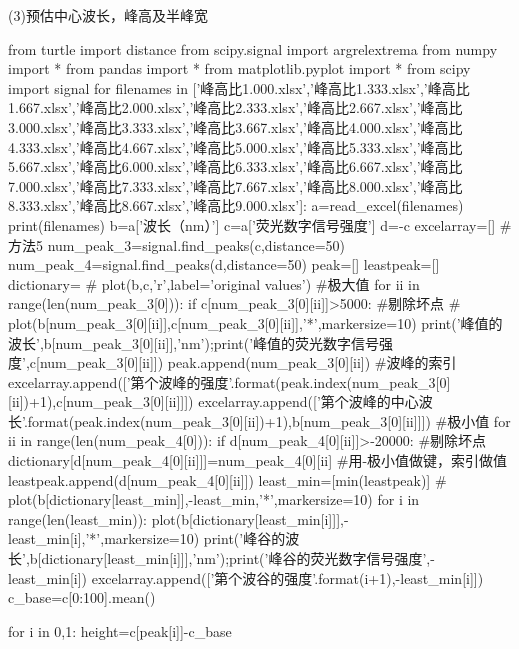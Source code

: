 \documentclass{article}
\numberwithin{equation}{subsection}
\begin{document}
(3)预估中心波长，峰高及半峰宽
\begin{python}
from turtle import distance
from scipy.signal import argrelextrema
from numpy import *
from pandas import *
from matplotlib.pyplot import *
from scipy import signal
for filenames in ['峰高比1.000.xlsx','峰高比1.333.xlsx','峰高比1.667.xlsx','峰高比2.000.xlsx','峰高比2.333.xlsx','峰高比2.667.xlsx','峰高比3.000.xlsx','峰高比3.333.xlsx','峰高比3.667.xlsx','峰高比4.000.xlsx','峰高比4.333.xlsx','峰高比4.667.xlsx','峰高比5.000.xlsx','峰高比5.333.xlsx','峰高比5.667.xlsx','峰高比6.000.xlsx','峰高比6.333.xlsx','峰高比6.667.xlsx','峰高比7.000.xlsx','峰高比7.333.xlsx','峰高比7.667.xlsx','峰高比8.000.xlsx','峰高比8.333.xlsx','峰高比8.667.xlsx','峰高比9.000.xlsx']:
    a=read_excel(filenames)
    print(filenames)
    b=a['波长（nm）']
    c=a['荧光数字信号强度']
    d=-c
    excelarray=[]
    #方法5
    num_peak_3=signal.find_peaks(c,distance=50)
    num_peak_4=signal.find_peaks(d,distance=50)
    peak=[]
    leastpeak=[]
    dictionary={}
    # plot(b,c,'r',label='original values')
    #极大值
    for ii in range(len(num_peak_3[0])):
        if c[num_peak_3[0][ii]]>5000:          #剔除坏点
            # plot(b[num_peak_3[0][ii]],c[num_peak_3[0][ii]],'*',markersize=10) 
            print('峰值的波长',b[num_peak_3[0][ii]],'nm');print('峰值的荧光数字信号强度',c[num_peak_3[0][ii]])
            peak.append(num_peak_3[0][ii])          #波峰的索引
            excelarray.append(['第{}个波峰的强度'.format(peak.index(num_peak_3[0][ii])+1),c[num_peak_3[0][ii]]])
            excelarray.append(['第{}个波峰的中心波长'.format(peak.index(num_peak_3[0][ii])+1),b[num_peak_3[0][ii]]])
    #极小值
    for ii in range(len(num_peak_4[0])):
        if d[num_peak_4[0][ii]]>-20000:          #剔除坏点
            dictionary[d[num_peak_4[0][ii]]]=num_peak_4[0][ii]          #用-极小值做键，索引做值
            leastpeak.append(d[num_peak_4[0][ii]])
    least_min=[min(leastpeak)]
    # plot(b[dictionary[least_min]],-least_min,'*',markersize=10) 
    for i in range(len(least_min)):
        plot(b[dictionary[least_min[i]]],-least_min[i],'*',markersize=10) 
        print('峰谷的波长',b[dictionary[least_min[i]]],'nm');print('峰谷的荧光数字信号强度',-least_min[i])
        excelarray.append(['第{}个波谷的强度'.format(i+1),-least_min[i]])
    c_base=c[0:100].mean()

    for i in 0,1:  
        height=c[peak[i]]-c_base


\end{python}
\end{document}
